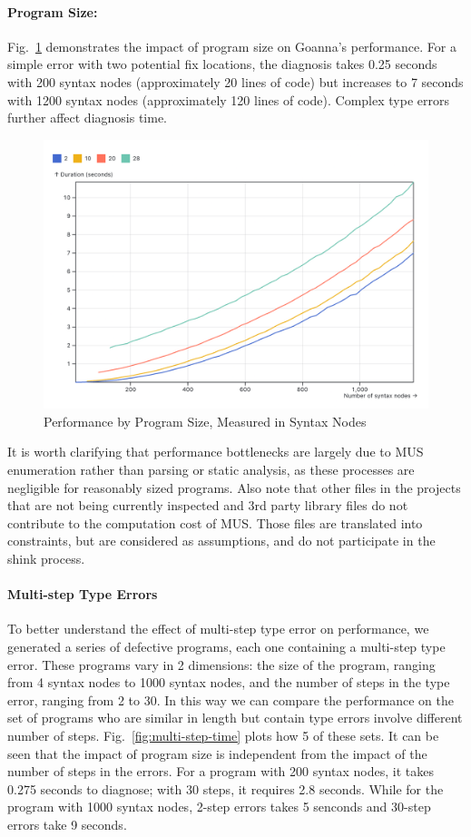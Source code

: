\documentclass[pdflatex,sn-mathphys-num]{sn-jnl}%
\begin{document}
\paragraph{Program Size:} Fig.~\ref{fig:node-size} demonstrates the impact of program size on Goanna's performance. For a simple error with two potential fix locations, the diagnosis takes 0.25 seconds with 200 syntax nodes (approximately 20 lines of code) but increases to 7 seconds with 1200 syntax nodes (approximately 120 lines of code). Complex type errors further affect diagnosis time.

\begin{figure}[ht]
    \centering
    \includegraphics[width=0.8\linewidth]{images/program-size.png}
    \caption{Performance by Program Size, Measured in Syntax Nodes}
    \label{fig:node-size}
\end{figure}

It is worth clarifying that performance bottlenecks are largely due to MUS enumeration rather than parsing or static analysis, as these processes are negligible for reasonably sized programs. Also note that other files in the projects that are not being currently inspected and 3rd party library files do not contribute to the computation cost of MUS. Those files are translated into constraints, but are considered as assumptions, and do not participate in the shink process.

\paragraph{Multi-step Type Errors}

To better understand the effect of multi-step type error on performance, we generated a series of defective programs, each one containing a multi-step type error. These programs vary in 2 dimensions: the size of the program, ranging from 4 syntax nodes to 1000 syntax nodes, and the number of steps in the type error, ranging from 2 to 30. In this way we can compare the performance on the set of programs who are similar in length but contain type errors involve different number of steps. Fig.~\ref{fig:multi-step-time} plots how 5 of these sets.  It can be seen that the impact of program size is independent from the impact of the number of steps in the errors. For a program with 200 syntax nodes, it takes 0.275 seconds to diagnose; with 30 steps, it requires 2.8 seconds. While for the program with 1000 syntax nodes, 2-step errors takes 5 senconds and 30-step errors take 9 seconds.
\end{document}
